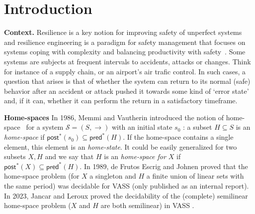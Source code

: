 \documentclass[runningheads]{llncs}
\newcommand{\pred}{\textsf{pred}}
\newcommand{\post}{\textsf{post}}
\begin{document}



\newcommand{\LCM}{\mathsf{LCM}}
\newcommand{\LOGSPACE}{\mathsf{LOGSPACE}}
\newcommand{\MSO}{\mathsf{MSO}}
\newcommand{\SO}{\mathsf{SO}}

 \newcommand{\N}{\mathds{N}}



\section{Introduction}\label{section introduction}


{\bf Context.} 
Resilience is a key notion for improving safety of unperfect systems and resilience engineering is a paradigm for safety management that focuses on systems coping with complexity and balancing productivity with safety~\cite{challenges}. Some systems are subjects at frequent intervals to accidents, attacks or changes. Think for instance of a supply chain, or an airport’s air trafic control. In such cases, a question that arises is that of whether the system can return to its normal (safe) behavior after an accident or attack
pushed it towards some kind of ‘error state’ and, if it can, whether it can perform the return in a satisfactory timeframe. 


{\bf Home-spaces}
 In 1986, Memmi and Vautherin introduced the notion of home-space~\cite{DBLP:conf/ac/MemmiV86} for a system $\mathscr{S} = (S,\rightarrow )$ with an initial state $s_0$ : a subset $H \subseteq S$ is an \emph{home-space}  if 
$\post^*(s_0) \subseteq \pred^*(H)$. If the home-space contains a single element, this element is an {\em home-state}.
It could be easily generalized for two subsets $X,H$ and we say that $H$ is an \emph{home-space for $X$} if $\post^*(X) \subseteq \pred^*(H)$. In 1989, de Frutos Escrig and Johnen proved that the home-space problem (for $X$ a singleton and $H$ a finite union of linear sets with the same period) was decidable for VASS (only published as an internal report). In 2023, Jancar and Leroux proved the decidability of the (complete) semilinear home-space problem ($X$ and $H$ are both semilinear)  in VASS \cite{DBLP:journals/corr/abs-2207-02697}.
\end{document}

